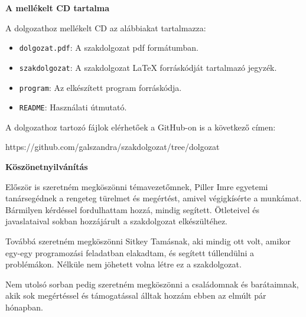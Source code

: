 \pagestyle{empty}

\noindent \textbf{\Large A mellékelt CD tartalma}

\vskip 1cm

A dolgozathoz mellékelt CD az alábbiakat tartalmazza:

\begin{itemize}
\item\texttt{dolgozat.pdf}: A szakdolgozat pdf formátumban.
\item\texttt{szakdolgozat}: A szakdolgozat LaTeX forráskódját tartalmazó jegyzék.
\item\texttt{program}: Az elkészített program forráskódja. 
\item\texttt{README}: Használati útmutató.
\end{itemize}

A dolgozathoz tartozó fájlok elérhetőek a GitHub-on is a következő címen:

https://github.com/galszandra/szakdolgozat/tree/dolgozat

\newpage

\begin{LARGE}
	\textbf{Köszönetnyilvánítás}
\end{LARGE}
\vskip 1cm

Először is szeretném megköszönni témavezetőmnek, Piller Imre egyetemi tanársegédnek a rengeteg türelmet és megértést, amivel végigkísérte a munkámat. Bármilyen kérdéssel fordulhattam hozzá, mindig segített. Ötleteivel és javaslataival sokban hozzájárult a szakdolgozat elkészültéhez.

Továbbá szeretném megköszönni Sitkey Tamásnak, aki mindig ott volt, amikor egy-egy programozási feladatban elakadtam, és segített túllendülni a problémákon. Nélküle nem jöhetett volna létre ez a szakdolgozat.

Nem utolsó sorban pedig szeretném megköszönni a családomnak és barátaimnak, akik sok megértéssel és támogatással álltak hozzám ebben az elmúlt pár hónapban.
